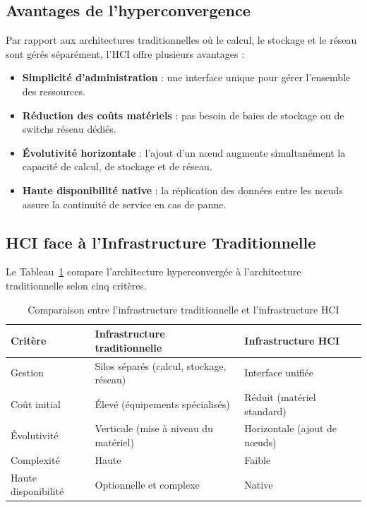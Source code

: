 \subsection{Avantages de l'hyperconvergence}

\par Par rapport aux architectures traditionnelles où le calcul, le stockage et le réseau sont gérés séparément, l'HCI offre plusieurs avantages :\\

\begin{itemize}

    \item \textbf{Simplicité d'administration} : une interface unique pour gérer l'ensemble des ressources.

    \item \textbf{Réduction des coûts matériels} : pas besoin de baies de stockage ou de switchs réseau dédiés.

    \item \textbf{Évolutivité horizontale} : l'ajout d'un n\oe{}ud augmente simultanément la capacité de calcul, de stockage et de réseau.

    \item \textbf{Haute disponibilité native} : la réplication des données entre les n\oe{}uds assure la continuité de service en cas de panne.

\end{itemize}

\subsection{HCI face à l'Infrastructure Traditionnelle}

\par Le Tableau~\ref{tab:hci-vs-traditionnel} compare l'architecture hyperconvergée à l'architecture traditionnelle selon cinq critères.\\

\begin{table}[H]
\centering
\caption{Comparaison entre l'infrastructure traditionnelle et l'infrastructure HCI}
\label{tab:hci-vs-traditionnel}
\begin{tabular}{|p{3cm}|p{8cm}|p{4cm}|}
\hline
\textbf{Critère} & \textbf{Infrastructure traditionnelle} & \textbf{Infrastructure HCI} \\
\hline
Gestion & Silos séparés (calcul, stockage, réseau) & Interface unifiée \\
\hline
Coût initial & Élevé (équipements spécialisés) & Réduit (matériel standard) \\
\hline
Évolutivité & Verticale (mise à niveau du matériel) & Horizontale (ajout de n\oe{}uds) \\
\hline
Complexité & Haute & Faible \\
\hline
Haute disponibilité & Optionnelle et complexe & Native \\
\hline
\end{tabular}
\end{table}

